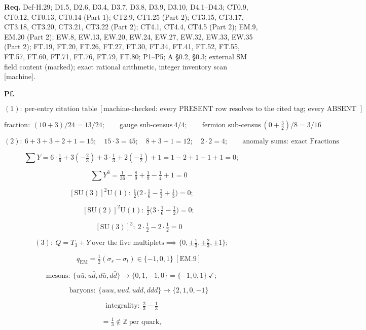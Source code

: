 \begin{theorem}
\textbf{Req.} Def-H.29; D1.5, D2.6, D3.4, D3.7, D3.8, D3.9, D3.10, D4.1–D4.3; CT0.9, CT0.12, CT0.13, CT0.14 (Part 1); CT2.9, CT1.25 (Part 2); CT3.15, CT3.17, CT3.18, CT3.20, CT3.21, CT3.22 (Part 2); CT4.1, CT4.4, CT4.5 (Part 2); EM.9, EM.20 (Part 2); EW.8, EW.13, EW.20, EW.24, EW.27, EW.32, EW.33, EW.35 (Part 2); FT.19, FT.20, FT.26, FT.27, FT.30, FT.34, FT.41, FT.52, FT.55, FT.57, FT.60, FT.71, FT.76, FT.79, FT.80; P1–P5; A §0.2, §0.3; external SM field content (marked); exact rational arithmetic, integer inventory scan [machine].

\textbf{Pf.}

\[
(1):\ \text{per-entry citation table}\ [\text{machine-checked: every PRESENT row resolves to the cited tag; every ABSENT row to a scan count or a no-go}]
\]

\[
\text{fraction}:\ (10+3)/24=13/24;\qquad\text{gauge sub-census}\ 4/4;\qquad\text{fermion sub-census}\ (0+\tfrac32)/8=3/16
\]

\[
(2):\ 6+3+3+2+1=15;\quad15\cdot3=45;\quad8+3+1=12;\quad2\cdot2=4;\qquad\text{anomaly sums}:\ \text{exact Fractions}
\]

\[
\textstyle\sum Y=6\cdot\tfrac16+3(-\tfrac23)+3\cdot\tfrac13+2(-\tfrac12)+1=1-2+1-1+1=0;
\]

\[
\qquad \sum Y^3=\tfrac1{36}-\tfrac89+\tfrac19-\tfrac14+1=0
\]

\[
[\mathrm{SU}(3)]^2\mathrm U(1):\ \tfrac12\bigl(2\cdot\tfrac16-\tfrac23+\tfrac13\bigr)=0;
\]

\[
\qquad [\mathrm{SU}(2)]^2\mathrm U(1):\ \tfrac12\bigl(3\cdot\tfrac16-\tfrac12\bigr)=0;
\]

\[
\qquad [\mathrm{SU}(3)]^3:\ 2\cdot\tfrac12-2\cdot\tfrac12=0
\]

\[
(3):\ Q=T_3+Y\ \text{over the five multiplets}\implies\{0,\pm\tfrac13,\pm\tfrac23,\pm1\};
\]

\[
\qquad q_{\mathrm{EM}}=\tfrac12(\sigma_s-\sigma_t)\in\{-1,0,1\}\ [\mathrm{EM.9}]
\]

\[
\text{mesons}:\ \{u\bar u,u\bar d,d\bar u,d\bar d\}\to\{0,1,-1,0\}=\{-1,0,1\}\ \checkmark;
\]

\[
\qquad \text{baryons}:\ \{uuu,uud,udd,ddd\}\to\{2,1,0,-1\}
\]

\[
\text{integrality}:\ \tfrac23-\tfrac13
\]

\[
= \tfrac13\notin\mathbb Z\ \text{per quark},
\]


\end{theorem}
